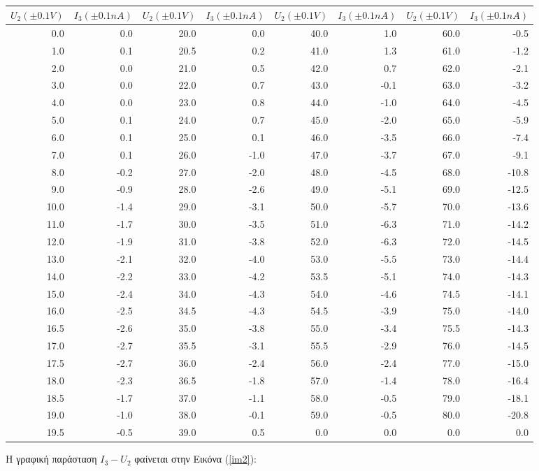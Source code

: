 \documentclass[a4paper]{article}
\begin{document}
			\begin{table}[h!]
				\centering
				\begin{tabular}{r|r|||r|r|||r|r|||r|r}
				$U_2(\pm0.1V)$ & $I_3(\pm0.1nA)$ & $U_2(\pm0.1V)$ & $I_3(\pm0.1nA)$ & $U_2(\pm0.1V)$ & $I_3(\pm0.1nA)$ & $U_2(\pm0.1V)$ & $I_3(\pm0.1nA)$ \\\hline\hline
0.0&0.0&20.0&0.0&40.0&1.0&60.0&-0.5\\
1.0&0.1&20.5&0.2&41.0&1.3&61.0&-1.2\\
2.0&0.0&21.0&0.5&42.0&0.7&62.0&-2.1\\
3.0&0.0&22.0&0.7&43.0&-0.1&63.0&-3.2\\
4.0&0.0&23.0&0.8&44.0&-1.0&64.0&-4.5\\
5.0&0.1&24.0&0.7&45.0&-2.0&65.0&-5.9\\
6.0&0.1&25.0&0.1&46.0&-3.5&66.0&-7.4\\
7.0&0.1&26.0&-1.0&47.0&-3.7&67.0&-9.1\\
8.0&-0.2&27.0&-2.0&48.0&-4.5&68.0&-10.8\\
9.0&-0.9&28.0&-2.6&49.0&-5.1&69.0&-12.5\\
10.0&-1.4&29.0&-3.1&50.0&-5.7&70.0&-13.6\\
11.0&-1.7&30.0&-3.5&51.0&-6.3&71.0&-14.2\\
12.0&-1.9&31.0&-3.8&52.0&-6.3&72.0&-14.5\\
13.0&-2.1&32.0&-4.0&53.0&-5.5&73.0&-14.4\\
14.0&-2.2&33.0&-4.2&53.5&-5.1&74.0&-14.3\\
15.0&-2.4&34.0&-4.3&54.0&-4.6&74.5&-14.1\\
16.0&-2.5&34.5&-4.3&54.5&-3.9&75.0&-14.0\\
16.5&-2.6&35.0&-3.8&55.0&-3.4&75.5&-14.3\\
17.0&-2.7&35.5&-3.1&55.5&-2.9&76.0&-14.5\\
17.5&-2.7&36.0&-2.4&56.0&-2.4&77.0&-15.0\\
18.0&-2.3&36.5&-1.8&57.0&-1.4&78.0&-16.4\\
18.5&-1.7&37.0&-1.1&58.0&-0.5&79.0&-18.1\\
19.0&-1.0&38.0&-0.1&59.0&-0.5&80.0&-20.8\\
19.5&-0.5&39.0&0.5&0.0&0.0&0.0&0.0\\
				\end{tabular}
				\caption{ }
				\label{mat2}
			\end{table}
	
	Η γραφική παράσταση $I_3 - U_2$ φαίνεται στην Εικόνα (\ref{im2}): 
	
\end{document}
